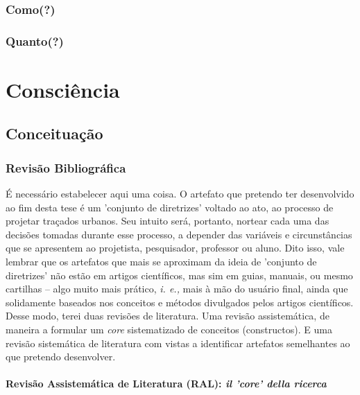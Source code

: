 \documentclass[]{report}
\begin{document}
\section{Como(?)}

\section{Quanto(?)}


\part[Consciência]{Consciência}
	\setcounter{secnumdepth}{1}
		\chapter{Conceituação}

			\section{Revisão Bibliográfica}

			É necessário estabelecer aqui uma coisa. O artefato que pretendo ter desenvolvido ao fim desta tese é um 'conjunto de diretrizes' voltado ao ato, ao processo de projetar traçados urbanos. Seu intuito será, portanto, nortear cada uma das decisões tomadas durante esse processo, a depender das variáveis e circunstâncias que se apresentem ao projetista, pesquisador, professor ou aluno. Dito isso, vale lembrar que os artefatos que mais se aproximam da ideia de 'conjunto de diretrizes' não estão em artigos científicos, mas sim em guias, manuais, ou mesmo cartilhas – algo muito mais prático, \textit{i. e.,} mais à mão do usuário final, ainda que solidamente baseados nos conceitos e métodos divulgados pelos artigos científicos. Desse modo, terei duas revisões de literatura. Uma revisão assistemática, de maneira a formular um \textit{core} sistematizado de conceitos (constructos). E uma revisão sistemática de literatura com vistas a identificar artefatos semelhantes ao que pretendo desenvolver.

				\subsection{Revisão Assistemática de Literatura (RAL): \textit{il 'core' della ricerca}}
\end{document}
